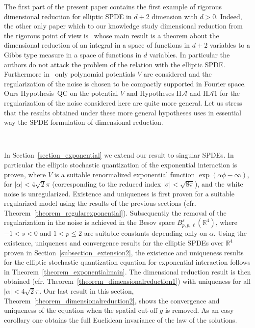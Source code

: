 \documentclass[a4paper,10pt]{article}
\begin{document}
The first part of the present paper contains the first example of rigorous
dimensional reduction for elliptic SPDE in $d + 2$ dimension with $d > 0$.
Indeed, the other only paper which to our knowledge study dimensional
reduction from the rigorous point of view is~{\cite{Klein1984}} whose main
result is a theorem about the dimensional reduction of an integral in a space
of functions in $d + 2$ variables to a Gibbs type measure in a space of
functions in $d$ variables. In particular the authors do not attack the
problem of the relation with the elliptic SPDE. Furthermore
in~{\cite{Klein1984}} only polynomial potentials $V$ are considered and the
regularization of the noise is chosen to be compactly supported in Fourier
space. Ours Hypothesis~QC on the potential $V$ and Hypotheses H$\mathcal{A}$
and H$\mathcal{A} 1$ for the regularization of the noise considered here are
quite more general. Let us stress that the results obtained under these more
general hypotheses uses in essential way the SPDE formulation of dimensional
reduction.

\

In Section~\ref{section_exponential} we extend our result to singular SPDEs.
In particular the elliptic stochastic quantization of the exponential
interaction is proven, where $V$ is a suitable renormalized exponential
function $\exp (\alpha \phi - \infty)$, for $| \alpha | < 4 \sqrt{2} \pi$
(corresponding to the reduced index $| \sigma | < \sqrt{8 \pi}$), and the
white noise is unregularized. Existence and uniqueness is first proven for a
suitable regularized model using the results of the previous sections (cfr.
Theorem~\ref{theorem_regularexponential}). Subsequently the removal of the
regularization in the noise is achieved in the Besov space $B^s_{p, p, \ell}
(\mathbb{R}^4)$, where $- 1 < s < 0$ and $1 < p \leqslant 2$ are suitable
constants depending only on $\alpha$. Using the existence, uniqueness and
convergence results for the elliptic SPDEs over $\mathbb{R}^4$ proven in
Section~\ref{subsection_extension2}, the existence and uniqueness results for
the elliptic stochastic quantization equation for exponential interaction
follows in Theorem~\ref{theorem_exponentialmain}. The dimensional reduction
result is then obtained (cfr. Theorem~\ref{theorem_dimensionalreduction1})
with uniqueness for all $| \alpha | < 4 \sqrt{2} \pi$. Our last result in this
section, Theorem~\ref{theorem_dimensionalreduction2}, shows the convergence
and uniqueness of the equation when the spatial cut-off $g$ is removed. As an
easy corollary one obtains the full Euclidean invariance of the law of the
solutions.
\end{document}
